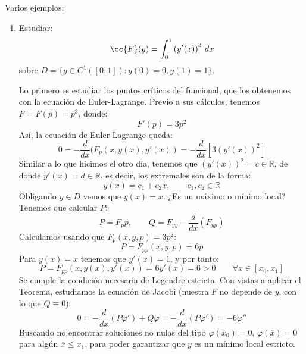 \begin{ejemplo}
    Varios ejemplos:
    \begin{enumerate}
        \item Estudiar:
            \begin{equation*}
                \cc{F}(y) = \int_{0}^{1} {(y'(x))}^{3}~dx  
            \end{equation*}
            sobre $D = \{y\in C^1([0,1]) : y(0) = 0, y(1) = 1\}$.

            Lo primero es estudiar los puntos críticos del funcional, que los obtenemos con la ecuación de Euler-Lagrange. Previo a sus cálculos, tenemos $F = F(p) = p^3$, donde:
            \begin{equation*}
                F'(p) = 3p^2
            \end{equation*}
            Así, la ecuación de Euler-Lagrange queda:
            \begin{equation*}
                0 = -\frac{d}{dx}(F_p(x,y(x),y'(x)) = -\frac{d}{dx}\left[3{(y'(x))}^{2}\right]
            \end{equation*}
            Similar a lo que hicimos el otro día, tenemos que ${(y'(x))}^{2} = c\in \mathbb{R}$, de donde $y'(x) = d\in \mathbb{R}$, es decir, los extremales son de la forma:
            \begin{equation*}
                y(x) = c_1 + c_2x, \qquad c_1,c_2\in \mathbb{R}
            \end{equation*}
            Obligando $y\in D$ vemos que $y(x) = x$. ¿Es un máximo o mínimo local? Tenemos que calcular $P$:
            \begin{equation*}
                P = F_pp, \qquad Q = F_{yy} - \frac{d}{dx}(F_{yp})
            \end{equation*}
            Calculamos usando que $F_p(x,y,p) = 3p^2$:
            \begin{equation*}
                P = F_{pp}(x,y,p) = 6p
            \end{equation*}
            Para $y(x) = x$ tenemos que $y'(x) = 1$, y por tanto:
            \begin{equation*}
                P = F_{pp}(x, y(x), y'(x)) = 6y'(x) = 6 > 0 \qquad \forall x\in [x_0,x_1]
            \end{equation*}
            Se cumple la condición necesaria de Legendre estricta. Con vistas a aplicar el Teorema, estudiamos la ecuación de Jacobi (nuestra $F$ no depende de $y$, con lo que $Q\equiv 0$):
            \begin{equation*}
                0 = -\frac{d}{dx}(P\varphi') + Q\varphi = -\frac{d}{dx}(P\varphi') = -6\varphi'' 
            \end{equation*}
            Buscando no encontrar soluciones no nulas del tipo $\varphi(x_0) = 0$, $\varphi(\overline{x}) = 0$ para algún $\overline{x}\leq x_1$, para poder garantizar que $y$ es un mínimo local estricto.


\end{enumerate}
\end{ejemplo}
